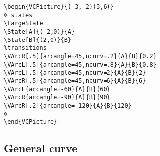\documentclass[11pt,twoside]{article}
\newlength{\parindenttemp} %
\newcommand{\noi}{\noindent}
\newlength{\jsIndent}%
\newlength{\ColSource}%
\newlength{\ColFigur}%
\begin{document}
\medskip
\noi 
\hspace*{-\jsIndent}
\begin{minipage}[c]{\ColFigur}%
\par\vspace*{0mm}%
\begin{center}
%
\end{center}
\end{minipage}%
\hspace*{1.2em}%
\begin{minipage}[c]{\ColSource}
\setlength{\parindent}{\parindenttemp}%
\par\vspace*{0mm}%
\footnotesize
\begin{verbatim}
\begin{VCPicture}{(-3,-2)(3,6)}
% states
\LargeState
\State[A]{(-2,0)}{A}
\State[B]{(2,0)}{B}
%transitions
\VArcR[.5]{arcangle=45,ncurv=.2}{A}{B}{0.2}
\VArcL[.5]{arcangle=45,ncurv=.8}{A}{B}{0.8}
\VArcL[.5]{arcangle=45,ncurv=2}{A}{B}{2}
\VArcR[.5]{arcangle=45,ncurv=6}{A}{B}{6}
\VArcL{arcangle=-60}{A}{B}{60}
\VArcR{arcangle=-90}{A}{B}{90}
\VArcR[.2]{arcangle=-120}{A}{B}{120}
%
\end{VCPicture}
\end{verbatim}
\normalsize
\end{minipage}%


\subsection{General curve}
\end{document}
